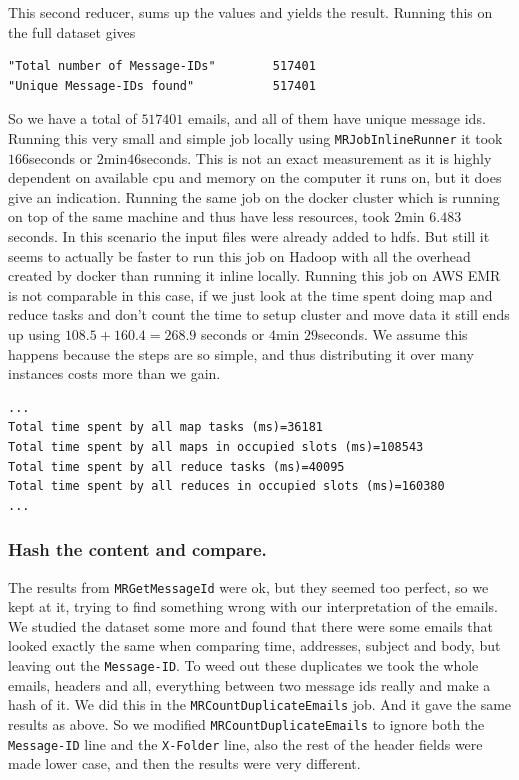 \documentclass[runningheads,a4paper]{llncs}
\begin{document}
This second reducer, sums up the values and yields the result. 
\newline
Running this on the full dataset gives
\begin{verbatim}
"Total number of Message-IDs"        517401
"Unique Message-IDs found"           517401
\end{verbatim}
So we have a total of $517401$ emails, and all of them have unique message ids.
\newline
Running this very small and simple job locally using \verb!MRJobInlineRunner! it took $166$seconds or $2$min$46$seconds. This is not an exact measurement as it is highly dependent on available cpu and memory on the computer it runs on, but it does give an indication.
\newline 
Running the same job on the docker cluster which is running on top of the same machine and thus have less resources, took $2$min $6.483$ seconds. In this scenario the input files were already added to hdfs. But still it seems to actually be faster to run this job on Hadoop with all the overhead created by docker than running it inline locally. 
\newline
Running this job on AWS EMR is not comparable in this case, if we just look at the time spent doing map and reduce tasks and don't count the time to setup cluster and move data it still ends up using $108.5 + 160.4 = 268.9$ seconds or $4$min $29$seconds. We assume this happens because the steps are so simple, and thus distributing it over many instances costs more than we gain.
\begin{verbatim}
...
Total time spent by all map tasks (ms)=36181
Total time spent by all maps in occupied slots (ms)=108543
Total time spent by all reduce tasks (ms)=40095
Total time spent by all reduces in occupied slots (ms)=160380
...
\end{verbatim}
\subsubsection{Hash the content and compare.}
The results from \verb!MRGetMessageId! were ok, but they seemed too perfect, so we kept at it, trying to find something wrong with our interpretation of the emails.
\newline
We studied the dataset some more and found that there were some emails that looked exactly the same when comparing time, addresses, subject and body, but leaving out the \verb!Message-ID!. To weed out these duplicates we took the whole emails, headers and all, everything between two message ids really and make a hash of it. We did this in the \verb!MRCountDuplicateEmails! job. And it gave the same results as above. So we modified \verb!MRCountDuplicateEmails! to ignore both the \verb!Message-ID! line and the \verb!X-Folder! line, also the rest of the header fields were made lower case, and then the results were very different.
\end{document}
